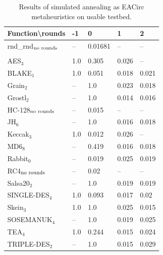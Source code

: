 \documentclass[
  print, %
  Table,   %
  nolof,     %
  nolot,     %
  11pt, %
  oneside  %
]{fithesis3}
\newcommand{\fd}{\cellcolor{red!13}}
\newcommand{\fn}{\cellcolor{green!13}}
\begin{document}
\begin{table}[H]
\centering
\begin{tabular}{l|l l l l}
Function\textbackslash{}rounds & -1 & 0 & 1 & 2\\ \hline
rnd\_rnd$_{\textnormal{no rounds}}$ & -- & \fn{}0.01681& -- & --    \\\\
AES$_{3}$        & \fd{}1.0   & \fd{}0.305 & \fn{}0.026 & \fn{}--   \\
BLAKE$_{1}$      & \fd{}1.0   & \fd{}0.051 & \fn{}0.018 & \fn{}0.021\\
Grain$_{2}$      & \fd{}--    & \fd{}1.0   & \fn{}0.023 & \fn{}0.018\\
Grostl$_{2}$     & \fd{}--    & \fd{}1.0   & \fn{}0.014 & \fn{}0.016\\
HC-128$_{\textnormal{no rounds}}$& -- & \fn{}0.015 & -- & --        \\
JH$_{6}$         & \fd{}--    & \fd{}1.0   & \fn{}0.016 & \fn{}0.018\\
Keccak$_{3}$     & \fd{}1.0   & \fn{}0.012 & \fn{}0.026 & \fn{}--   \\
MD6$_{8}$        & \fd{}--    & \fd{}0.419 & \fn{}0.016 & \fn{}0.018\\
Rabbit$_{0}$     &      --    & \fn{}0.019 & \fn{}0.025 & \fn{}0.019\\
RC4$_{\textnormal{no rounds}}$& -- & \fn{}0.02  & --    & --        \\
Salsa20$_{2}$    & \fd{}--    & \fd{}1.0   & \fn{}0.019 & \fn{}0.019\\
SINGLE-DES$_{4}$ & \fd{}1.0   & \fd{}0.093 & \fn{}0.017 & \fn{}0.02 \\
Skein$_{3}$      & \fd{}1.0   & \fd{}1.0   & \fn{}0.025 & \fn{}0.015\\
SOSEMANUK$_{4}$  & \fd{}--    & \fd{}1.0   & \fn{}0.019 & \fn{}0.025\\
TEA$_{4}$        & \fd{}1.0   & \fd{}0.244 & \fn{}0.015 & \fn{}0.024\\
TRIPLE-DES$_{2}$ & \fd{}--    & \fd{}1.0   & \fn{}0.015 & \fn{}0.029
\end{tabular}
\caption{Results of simulated annealing as EACirc metaheuristics on usable testbed.}
\label{table:res-usable-sa}
\end{table}
\end{document}
